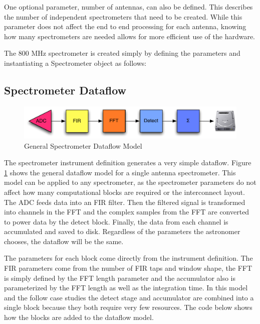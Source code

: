 One optional parameter, number of antennas, can also be defined. 
This describes the number of independent spectrometers that need to be created.
While this parameter does not affect the end to end processing for each antenna, knowing how many spectrometers are needed allows for more efficient use of the hardware.

The 800 MHz spectrometer is created simply by defining the parameters and instantiating a Spectrometer object as follows:



\subsection{Spectrometer Dataflow}

\begin{figure}[ht!]
  \centering
    \includegraphics[width=1\textwidth]{Images/C4/spectrometer_dataflow.pdf}
  \caption{General Spectrometer Dataflow Model}
  \label{fig: C4/spectrometer_dataflow.pdf}
\end{figure}

The spectrometer instrument definition generates a very simple dataflow. 
Figure \ref{fig: C4/spectrometer_dataflow.pdf} shows the general dataflow model for a single antenna spectrometer. 
This model can be applied to any spectrometer, as the spectrometer parameters do not affect how many computational blocks are required or the interconnect layout. 
The ADC feeds data into an FIR filter. 
Then the filtered signal is transformed into channels in the FFT and the complex samples from the FFT are converted to power data by the detect block.
Finally, the data from each channel is accumulated and saved to disk. Regardless of the parameters the astronomer chooses, the dataflow will be the same. 

The parameters for each block come directly from the instrument definition. 
The FIR parameters come from the number of FIR taps and window shape, the FFT is simply defined by the FFT length parameter and the accumulator also is parameterized by the FFT length as well as the integration time. 
In this model and the follow case studies the detect stage and accumulator are combined into a single block because they both require very few resources.
The code below shows how the blocks are added to the dataflow model.

